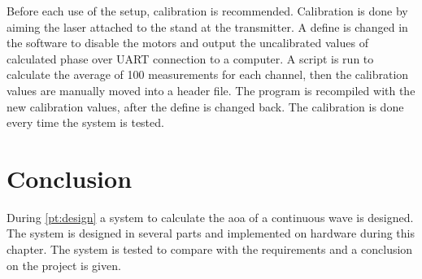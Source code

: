 Before each use of the setup, calibration is recommended. Calibration is done by aiming the laser attached to the stand at the transmitter. A define is changed in the software to disable the motors and output the uncalibrated values of calculated phase over UART connection to a computer. A script is run to calculate the average of 100 measurements for each channel, then the calibration values are manually moved into a header file. The program is recompiled with the new calibration values, after the define is changed back. The calibration is done every time the system is tested.

\section{Conclusion}
During \autoref{pt:design} a system to calculate the \gls{aoa} of a continuous wave is designed. The system is designed in several parts and implemented on hardware during this chapter. The system is tested to compare with the requirements and a conclusion on the project is given.